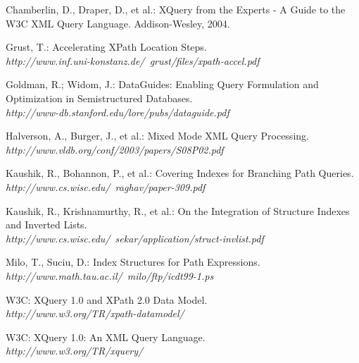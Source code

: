 \documentclass[a4paper,10pt]{article}
\begin{document}
\begin{thebibliography}{99}

 Chamberlin, D., Draper, D., et al.: XQuery from the Experts - A Guide to the W3C XML Query Language.
Addison-Wesley, 2004.

 Grust, T.: Accelerating XPath Location Steps.\\
\textit{http://www.inf.uni-konstanz.de/~grust/files/xpath-accel.pdf}

 Goldman, R.; Widom, J.: DataGuides: Enabling Query Formulation and Optimization in Semistructured Databases.\\
\textit{http://www-db.stanford.edu/lore/pubs/dataguide.pdf}

 Halverson, A., Burger, J., et al.: Mixed Mode XML Query Processing.\\
\textit{http://www.vldb.org/conf/2003/papers/S08P02.pdf}

 Kaushik, R., Bohannon, P., et al.: Covering Indexes for Branching Path Queries.\\
\textit{http://www.cs.wisc.edu/~raghav/paper-309.pdf}

 Kaushik, R., Krishnamurthy, R., et al.: On the Integration of Structure Indexes and Inverted Lists.\\
\textit{http://www.cs.wisc.edu/~sekar/application/struct-invlist.pdf}

 Milo, T., Suciu, D.: Index Structures for Path Expressions.\\
\textit{http://www.math.tau.ac.il/~milo/ftp/icdt99-1.ps}

 W3C: XQuery 1.0 and XPath 2.0 Data Model.\\
\textit{http://www.w3.org/TR/xpath-datamodel/}

 W3C: XQuery 1.0: An XML Query Language.\\
\textit{http://www.w3.org/TR/xquery/}

\end{thebibliography}
\end{document}
